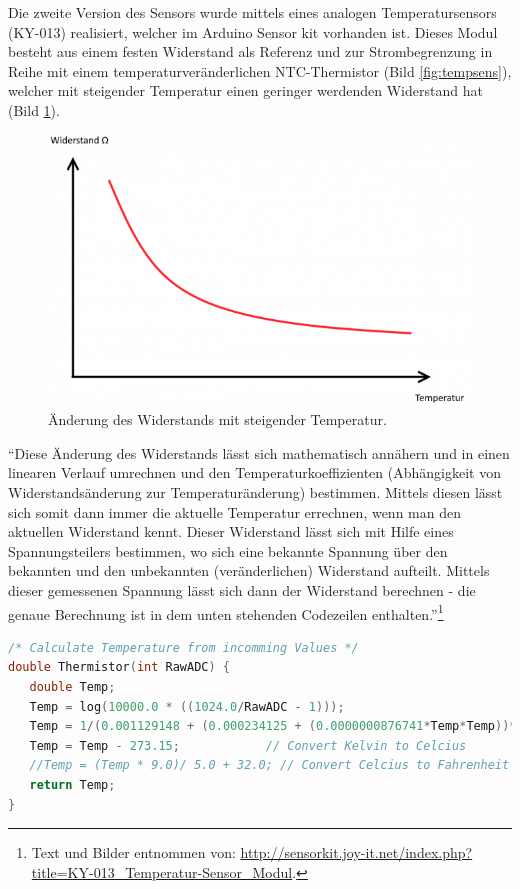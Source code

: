 Die zweite Version des Sensors wurde mittels eines analogen
Temperatursensors (KY-013) realisiert, welcher im Arduino Sensor kit
vorhanden ist. Dieses Modul besteht aus einem festen Widerstand als
Referenz und zur Strombegrenzung in Reihe mit einem
temperaturveränderlichen NTC-Thermistor (Bild \ref{fig:tempsens}),
welcher mit steigender Temperatur einen geringer werdenden Widerstand
hat (Bild \ref{fig:tempkurve}).

\begin{figure}
\centering
\includegraphics[width=.6\textwidth]{includes/sensor_pics/610px-KY-013_NTC-Kurve.png}
\caption{Änderung des Widerstands mit steigender
Temperatur.}
\label{fig:tempkurve}
\end{figure}

``Diese Änderung des Widerstands lässt sich mathematisch annähern und
in einen linearen Verlauf umrechnen und den Temperaturkoeffizienten
(Abhängigkeit von Widerstandsänderung zur Temperaturänderung)
bestimmen. Mittels diesen lässt sich somit dann immer die aktuelle
Temperatur errechnen, wenn man den aktuellen Widerstand kennt. Dieser
Widerstand lässt sich mit Hilfe eines Spannungsteilers bestimmen, wo
sich eine bekannte Spannung über den bekannten und den unbekannten
(veränderlichen) Widerstand aufteilt. Mittels dieser gemessenen
Spannung lässt sich dann der Widerstand berechnen - die genaue
Berechnung ist in dem unten stehenden Codezeilen
enthalten.''\footnote{Text und Bilder entnommen von:
\url{http://sensorkit.joy-it.net/index.php?title=KY-013_Temperatur-Sensor_Modul}.}

\begin{lstlisting}[language=C, caption=Umrechnung des Analogwerts in Temperatur.]
/* Calculate Temperature from incomming Values */
double Thermistor(int RawADC) {
   double Temp;
   Temp = log(10000.0 * ((1024.0/RawADC - 1)));
   Temp = 1/(0.001129148 + (0.000234125 + (0.0000000876741*Temp*Temp))*Temp);
   Temp = Temp - 273.15;            // Convert Kelvin to Celcius
   //Temp = (Temp * 9.0)/ 5.0 + 32.0; // Convert Celcius to Fahrenheit
   return Temp;
}
\end{lstlisting}

